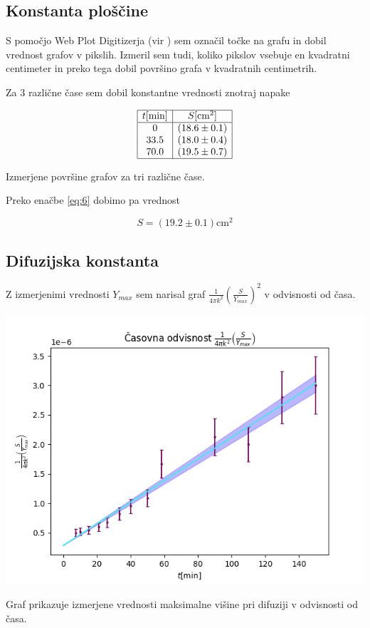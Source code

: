 \documentclass[11pt]{article}
\begin{document}
\subsection{Konstanta ploščine}\label{sec:org31b401e}

S pomočjo Web Plot Digitizerja (vir \cite{noauthor_webplotdigitizer_nodate}) sem označil točke na grafu in dobil vrednost grafov v pikslih. Izmeril sem tudi, koliko pikslov vsebuje en kvadratni centimeter in preko tega dobil površino grafa v kvadratnih centimetrih.

Za 3 različne čase sem dobil konstantne vrednosti znotraj napake

\begin{tabela}
  \centering
\[
  \begin{array}{|c|c|} \hline
    t [\mathrm{min}] & S [\mathrm{cm} ^2] \\ \hline
   0 & (18.6 \pm 0.1) \\
    33.5 & (18.0 \pm 0.4) \\
    70.0 & (19.5 \pm 0.7) \\ \hline
  \end{array}
\]
\caption{\small Izmerjene površine grafov za tri različne čase.}
\end{tabela}

Preko enačbe \ref{eq:6} dobimo pa vrednost

\[ S = (19.2 \pm 0.1) \mathrm{cm} ^2
\]
\subsection{Difuzijska konstanta}\label{sec:orga79e3ef}

Z izmerjenimi vrednosti \(Y_{max}\) sem narisal graf \(\frac{1}{4 \pi k ^2} \left( \frac{S}{Y_{max}} \right)^2\) v odvisnosti od časa.

\begin{slika}[H]
  \centering
  \includegraphics{./figures/DifKonstanta.png}
  \caption{\small Graf prikazuje izmerjene vrednosti maksimalne višine pri difuziji v odvisnosti od časa.}
\end{slika}
\end{document}
